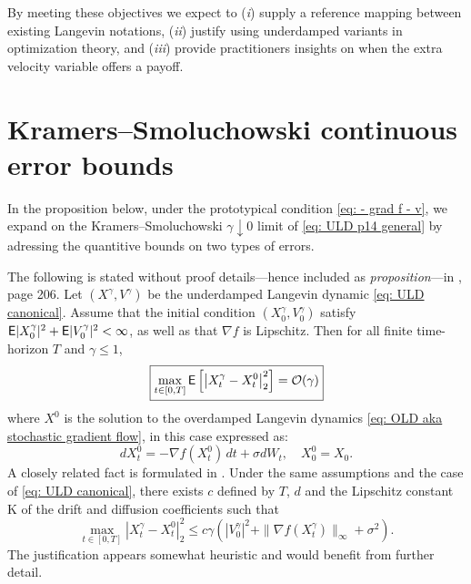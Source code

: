 \documentclass[12pt]{article}
\begin{document}
By meeting these objectives we expect to (\textit{i}) supply a reference mapping between existing Langevin notations,  (\textit{ii}) justify using underdamped variants in optimization theory, and (\textit{iii}) provide practitioners insights on when the extra velocity variable offers a payoff.

\section{Kramers--Smoluchowski continuous error bounds}

In the proposition below, under the prototypical condition \eqref{eq: - grad f - v}, we expand on the Kramers--Smoluchowski $\gamma \downarrow 0$ limit of \eqref{eq: ULD p14 general} by adressing the quantitive bounds on two types of errors.

\begin{proposition}
\label{prop: KS cont bounds}
The following is stated without proof details---hence included as \emph{proposition}---in \cite{p14}, page 206.
Let $(X^{\gamma}, V^{\gamma})$ be the underdamped Langevin dynamic \eqref{eq: ULD canonical}.
Assume that the initial condition $(X_0^{\gamma}, V_0^{\gamma})$ satisfy ${\mathsf E}|X_0^\gamma|^2 + {\mathsf E}|V_0^\gamma|^2 < \infty$, as well as that $\nabla f$ is Lipschitz.
Then for all finite time-horizon $T$ and $\gamma \le 1$,
\begin{equation}
\label{eq: p14 max E (weak)}
\boxed{
\max_{t \in [0, T]} {\mathsf E} \left[ \left|X_t^{\gamma} - X_t^0\right|_2^2 \right] = \mathcal{O}(\gamma)
}
\end{equation}
where $X^0$ is the solution to the overdamped Langevin dynamics \eqref{eq: OLD aka stochastic gradient flow}, in this case expressed as:
\[
dX_t^0 = -\nabla f(X_t^0)\,dt + \sigma dW_t, \quad X_0^0 = X_0.
\]
A closely related fact is formulated in \cite{f04}.
Under the same assumptions and the case of \eqref{eq: ULD canonical}, there exists $c$ defined by $T$, $d$ and the Lipschitz constant K of the drift and diffusion coefficients such that
\begin{equation}
\label{eq: f04 strong bound orig}
\max_{t\in[0, T]}|X_t^{\gamma} - X_t^0|_2^2 \le c\gamma \left(|V_0^\gamma|^2+\|\nabla f(X_t^\gamma)\|_{\infty}+\sigma^2\right).
\end{equation}
The justification appears somewhat heuristic and would benefit from further detail.
\end{proposition}
\end{document}
